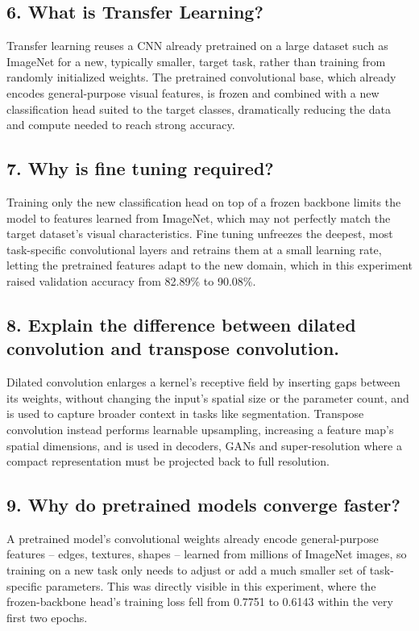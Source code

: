 \documentclass[11pt,a4paper]{article}
\begin{document}
\subsection*{6. What is Transfer Learning?}

Transfer learning reuses a CNN already pretrained on a large dataset such as ImageNet for a new, typically smaller, target task, rather than training from randomly initialized weights. The pretrained convolutional base, which already encodes general-purpose visual features, is frozen and combined with a new classification head suited to the target classes, dramatically reducing the data and compute needed to reach strong accuracy.

\subsection*{7. Why is fine tuning required?}

Training only the new classification head on top of a frozen backbone limits the model to features learned from ImageNet, which may not perfectly match the target dataset's visual characteristics. Fine tuning unfreezes the deepest, most task-specific convolutional layers and retrains them at a small learning rate, letting the pretrained features adapt to the new domain, which in this experiment raised validation accuracy from 82.89\% to 90.08\%.

\subsection*{8. Explain the difference between dilated convolution and transpose convolution.}

Dilated convolution enlarges a kernel's receptive field by inserting gaps between its weights, without changing the input's spatial size or the parameter count, and is used to capture broader context in tasks like segmentation. Transpose convolution instead performs learnable upsampling, increasing a feature map's spatial dimensions, and is used in decoders, GANs and super-resolution where a compact representation must be projected back to full resolution.

\subsection*{9. Why do pretrained models converge faster?}

A pretrained model's convolutional weights already encode general-purpose features -- edges, textures, shapes -- learned from millions of ImageNet images, so training on a new task only needs to adjust or add a much smaller set of task-specific parameters. This was directly visible in this experiment, where the frozen-backbone head's training loss fell from 0.7751 to 0.6143 within the very first two epochs.
\end{document}
